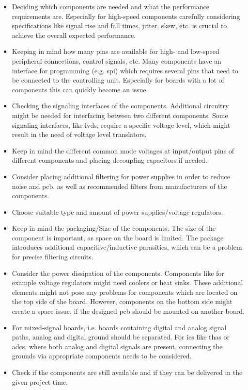 \begin{itemize}
	\item Deciding which components are needed and what the performance requirements are. Especially for high-speed components carefully considering specifications like signal rise and fall times, jitter, skew, etc. is crucial to achieve the overall expected performance.
	\item Keeping in mind how many pins are available for high- and low-speed peripheral connections, control signals, etc. Many components have an interface for programming (e.g. \gls{spi}) which requires several pins that need to be connected to the controlling unit. Especially for boards with a lot of components this can quickly become an issue.
	\item Checking the signaling interfaces of the components. Additional circuitry might be needed for interfacing between two different components. Some signaling interfaces, like \gls{lvds}, require a specific voltage level, which might result in the need of voltage level translators.
	\item Keep in mind the different common mode voltages at input/output pins of different components and placing decoupling capacitors if needed.
	\item Consider placing additional filtering for power supplies in order to reduce noise and \gls{pcb}, as well as recommended filters from manufacturers of the components. 
	\item Choose suitable type and amount of power supplies/voltage regulators.
	\item Keep in mind the packaging/Size of the components. The size of the component is important, as space on the board is limited. The package introduces additional capacitive/inductive parasitics, which can be a problem for precise filtering circuits. 
	\item Consider the power dissipation of the components. Components like for example voltage regulators might need coolers or heat sinks. These additional elements might not pose any problems for components which are located on the top side of the board. However, components on the bottom side might create a space issue, if the designed \gls{pcb} should be mounted on another board.
	\item For mixed-signal boards, i.e. boards containing digital and analog signal paths, analog and digital ground should be separated. For \glspl{ic} like \glspl{tha} or \glspl{adc}, where both analog and digital signals are present, connecting the grounds via appropriate components needs to be considered.
	\item Check if the components are still available and if they can be delivered in the given project time.
\end{itemize}  

